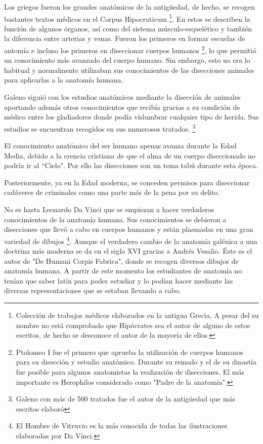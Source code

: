 Los griegos fueron los grandes anatómicos de la antigüedad, de hecho, se recogen bastantes textos médicos en el Corpus Hipocraticum \footnote{Colección de trabajos médicos elaborados en la antigua Grecia. A pesar del su nombre no está comprobado que Hipócrates sea el autor de alguno de estos escritos, de hecho se desconoce el autor de la mayoría de ellos.}. En estos se describen la función de algunos órganos, así como del sistema músculo-esquelético y también la diferencia entre arterias y venas. Fueron los primeros en formar escuelas de antomía e incluso los primeros en diseccionar cuerpos humanos \footnote{Ptolomeo I fue el primero que aprueba la utilización de cuerpos humanos para su disección y estudio anatómico. Durante su reinado y el de su dinastía fue posible para algunos anatomistas la realización de disecciones. El más importante es Herophilos considerado como "Padre de la anatomía".}, lo que permitió un conocimiento más avanzado del cuerpo humano. Sin embargo, esto no era lo habitual y normalmente utilizaban sus conocimientos de las disecciones animales para aplicarlas a la anatomía humana.

Galeno siguió con los estudios anatómicos mediante la disección de animales aportando además otros conocimientos que recibía gracias a su condición de médico entre los gladiadores donde podía vislumbrar cualquier tipo de herida. Sus estudios se encuentran recogidos en sus numerosos tratados. \footnote{Galeno con más de 500 tratados fue el autor de la antigüedad que más escritos elaboró}

El conocimiento anatómico del ser humano apenas avanza durante la Edad Media, debido  a la crencia cristiana de que el alma de un cuerpo diseccionado no podría ir al ``Cielo". Por ello las disecciones son un tema tabú durante esta época.

Posteriormente, ya en la Edad moderna, se conceden permisos para diseccionar cadáveres de criminales como una parte más de la pena por su delito.

No es hasta Leonardo Da Vinci que se empiezan a hacer verdaderos conocimientos de la anatomía humana. Sus conocimientos se debieron a disecciones que llevó a cabo en cuerpos humanos y están plasmadas en una gran variedad de dibujos \footnote{El Hombre de Vitruvio es la más conocida de todas las ilustraciones elaboradas por Da Vinci.}. Aunque el verdadero cambio de la anatomía galénica a una doctrina más moderna se da en el siglo XVI gracias a Andrés Vesalio. Éste es el autor de "De Humani Corpis Fabrica", donde se recogen diversos dibujos de anatomía humana. A partir de este momento los estudiantes de anatomía no tenían que saber latín para poder estudiar y lo podían hacer mediante las diversas representaciones que se estaban llevando a cabo.

